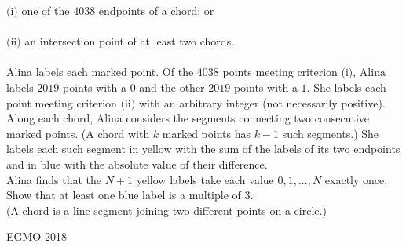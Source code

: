 $\text{(i)}$ one of the $4038$ endpoints of a chord; or \\\\
$\text{(ii)}$ an intersection point of at least two chords. \\\\
Alina labels each marked point. Of the $4038$ points meeting criterion $\text{(i)}$, Alina labels $2019$ points with a $0$ and the other $2019$ points with a $1$. She labels each point meeting criterion $\text{(ii)}$ with an arbitrary integer (not necessarily positive). \\
Along each chord, Alina considers the segments connecting two consecutive marked points. (A chord with $k$ marked points has $k-1$ such segments.) She labels each such segment in yellow with the sum of the labels of its two endpoints and in blue with the absolute value of their difference. \\
Alina finds that the $N + 1$ yellow labels take each value $0, 1, . . . , N$ exactly once. Show that at least one blue label is a multiple of $3$. \\
(A chord is a line segment joining two different points on a circle.) 

EGMO 2018 

